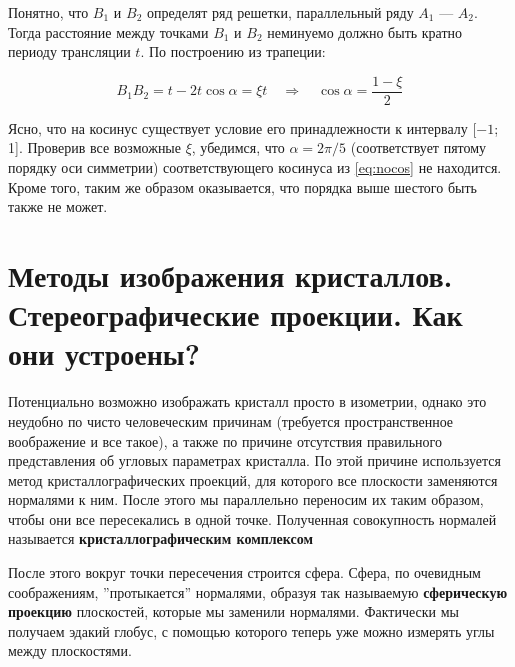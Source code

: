 \documentclass[a4paper, 12pt]{article}
\newcommand{\qrq}
{\ensuremath{\quad \Rightarrow \quad}} %
\begin{document}
Понятно, что $B_1$ и $B_2$ определят ряд решетки, параллельный ряду $A_1$ --- $A_2$. Тогда расстояние между точками $B_1$ и $B_2$ неминуемо должно быть кратно периоду трансляции $t$. По построению из трапеции:

\begin{equation}
	B_1B_2 = t - 2t\cos\alpha = \xi t \qrq \cos\alpha = \frac{1 - \xi}{2}
	\label{eq:nocos}
\end{equation}

Ясно, что на косинус существует условие его принадлежности к интервалу [$-1$; 1]. Проверив все возможные $\xi$, убедимся, что $\alpha = 2\pi/5$ (соответствует пятому порядку оси симметрии) соответствующего косинуса из \ref{eq:nocos} не находится. Кроме того, таким же образом оказывается, что порядка выше шестого быть также не может.

\section{Методы изображения кристаллов. Стереографические проекции. Как они устроены?}

%
%
%
%

Потенциально возможно изображать кристалл просто в изометрии, однако это неудобно по чисто человеческим причинам (требуется пространственное воображение и все такое), а также по причине отсутствия правильного представления об угловых параметрах кристалла. По этой причине используется метод кристаллографических проекций, для которого все плоскости заменяются нормалями к ним. После этого мы параллельно переносим их таким образом, чтобы они все пересекались в одной точке. Полученная совокупность нормалей называется \textbf{кристаллографическим комплексом}

После этого вокруг точки пересечения строится сфера. Сфера, по очевидным соображениям, ''протыкается'' нормалями, образуя так называемую \textbf{сферическую проекцию} плоскостей, которые мы заменили нормалями. Фактически мы получаем эдакий глобус, с помощью которого теперь уже можно измерять углы между плоскостями.
\end{document}
